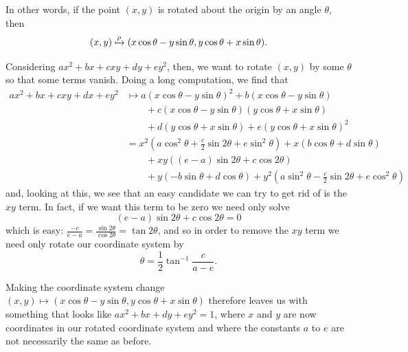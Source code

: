 \documentclass[a4paper,leqno,10pt]{article}
\theoremstyle{exercise}
\theoremstyle{plain}
\theoremstyle{definition}
\theoremstyle{remark}
\begin{document}
In other words, if the point $ (x,y) $ is rotated about the origin by an angle $ \theta $, then
\begin{equation}
  (x,y) \xmapsto{\rho} (x \cos \theta - y \sin \theta,y \cos \theta + x \sin \theta).
\end{equation}

Considering $ ax^2 + bx + cxy + dy + ey^2 $, then, we want to rotate $ (x,y) $ by some $ \theta $ so that some terms vanish. Doing
a long computation, we find that
\begin{align*}
  ax^2 + bx + cxy + dx + ey^2 &\mapsto a(x \cos \theta - y \sin \theta)^2 + b(x \cos \theta - y \sin \theta)\\
                              &  \qquad + c(x \cos \theta - y \sin \theta)(y \cos \theta + x \sin \theta)\\
                              &  \qquad + d(y \cos \theta + x \sin \theta) + e(y \cos \theta + x \sin \theta)^2\\
                              &= x^2(a\cos^2 \theta + \frac{c}{2}\sin 2\theta + e\sin^2 \theta) + x(b \cos \theta + d\sin \theta)\\
                              &  \qquad + xy ((e - a)\sin 2\theta + c \cos 2\theta)\\
                              &  \qquad + y(-b \sin \theta + d \cos \theta) + y^2(a\sin^2 \theta - \frac{c}{2}\sin 2\theta + e\cos^2 \theta)
\end{align*}
and, looking at this, we see that an easy candidate we can try to get rid of is the $ xy $ term. In fact, if we want this term
to be zero we need only solve
\begin{equation}
  (e - a)\sin 2\theta + c \cos 2\theta = 0
\end{equation}
which is easy: $ \frac{-c}{e - a} = \frac{\sin 2\theta}{\cos 2\theta} = \tan 2\theta $, and so in order to remove
the $ xy $ term we need only rotate our coordinate system by
\begin{equation}
  \theta = \frac{1}{2}\tan^{-1} \frac{c}{a - e}.
\end{equation}

Making the coordinate system change $ (x,y) \mapsto (x \cos \theta - y \sin \theta,y \cos \theta + x \sin \theta) $ therefore leaves
us with something that looks like $ ax^2 + bx + dy + ey^2 = 1 $, where $ x $ and $ y $ are now coordinates in our rotated coordinate
system and where the constants $ a $ to $ e $ are not necessarily the same as before.
\end{document}
